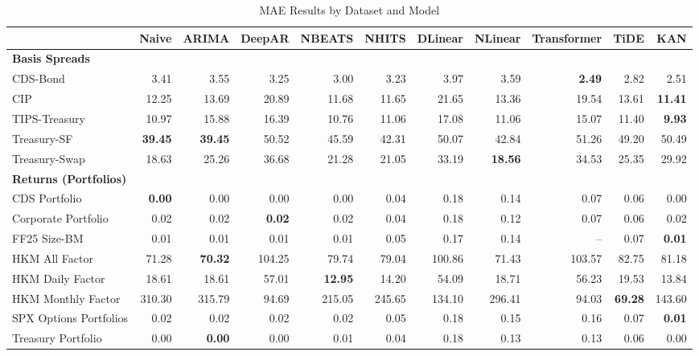 
\begin{table}[htbp]
\centering
\caption{MAE Results by Dataset and Model}
\label{tab:mae_results}
\scriptsize
\setlength{\tabcolsep}{1.5pt}
\renewcommand{\arraystretch}{0.9}
\begin{tabular}{@{}lrrrrrrrrrr@{}}
\toprule
 & Naive & ARIMA & DeepAR & NBEATS & NHITS & DLinear & NLinear & Transformer & TiDE & KAN \\
\midrule
\multicolumn{11}{l}{\textbf{Basis Spreads}} \\
CDS-Bond & 3.41 & 3.55 & 3.25 & 3.00 & 3.23 & 3.97 & 3.59 & \textbf{2.49} & 2.82 & 2.51 \\
CIP & 12.25 & 13.69 & 20.89 & 11.68 & 11.65 & 21.65 & 13.36 & 19.54 & 13.61 & \textbf{11.41} \\
TIPS-Treasury & 10.97 & 15.88 & 16.39 & 10.76 & 11.06 & 17.08 & 11.06 & 15.07 & 11.40 & \textbf{9.93} \\
Treasury-SF & \textbf{39.45} & \textbf{39.45} & 50.52 & 45.59 & 42.31 & 50.07 & 42.84 & 51.26 & 49.20 & 50.49 \\
Treasury-Swap & 18.63 & 25.26 & 36.68 & 21.28 & 21.05 & 33.19 & \textbf{18.56} & 34.53 & 25.35 & 29.92 \\
\midrule
\multicolumn{11}{l}{\textbf{Returns (Portfolios)}} \\
CDS Portfolio & \textbf{0.00} & 0.00 & 0.00 & 0.00 & 0.04 & 0.18 & 0.14 & 0.07 & 0.06 & 0.00 \\
Corporate Portfolio & 0.02 & 0.02 & \textbf{0.02} & 0.02 & 0.04 & 0.18 & 0.12 & 0.07 & 0.06 & 0.02 \\
FF25 Size-BM & 0.01 & 0.01 & 0.01 & 0.01 & 0.05 & 0.17 & 0.14 & -- & 0.07 & \textbf{0.01} \\
HKM All Factor & 71.28 & \textbf{70.32} & 104.25 & 79.74 & 79.04 & 100.86 & 71.43 & 103.57 & 82.75 & 81.18 \\
HKM Daily Factor & 18.61 & 18.61 & 57.01 & \textbf{12.95} & 14.20 & 54.09 & 18.71 & 56.23 & 19.53 & 13.84 \\
HKM Monthly Factor & 310.30 & 315.79 & 94.69 & 215.05 & 245.65 & 134.10 & 296.41 & 94.03 & \textbf{69.28} & 143.60 \\
SPX Options Portfolios & 0.02 & 0.02 & 0.02 & 0.02 & 0.05 & 0.18 & 0.15 & 0.16 & 0.07 & \textbf{0.01} \\
Treasury Portfolio & 0.00 & \textbf{0.00} & 0.00 & 0.01 & 0.04 & 0.18 & 0.13 & 0.13 & 0.06 & 0.00 \\

\end{tabular}
\end{table}
